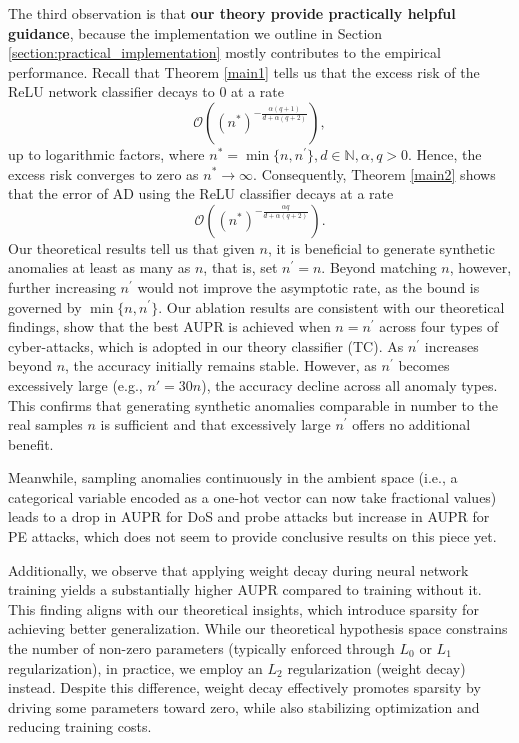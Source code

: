 \documentclass{article}
\def\NN{\mathbb N}
\begin{document}
The third observation is that \textbf{our theory provide practically helpful guidance}, because the implementation we outline in Section \ref{section:practical_implementation} mostly contributes to the empirical performance.
Recall that Theorem \ref{main1} tells us that the excess risk of the ReLU network classifier decays to $0$ at a rate $$\mathcal{O}\left((n^*)^{-{\frac{\alpha (q+1)}{d+ \alpha (q+2)}}}\right),$$ up to logarithmic factors, where $n^*= \min\{n,n^\prime\}, d\in \NN, \alpha,q>0$. Hence, the excess risk converges to zero as $n^* \to \infty$. Consequently, Theorem \ref{main2} shows that the error of AD using the ReLU classifier decays at a rate $$\mathcal{O}\left((n^*)^{-\frac{\alpha q}{d+ \alpha (q+2)}}\right).$$
Our theoretical results tell us that given $n$, it is beneficial to generate synthetic anomalies at least as many as $n$, that is, set $n^\prime = n$. Beyond matching $n$, however, further increasing 
$n^\prime$ would not improve the asymptotic rate, as the bound is governed by $\min\{n,n^\prime\}$.
Our ablation results are consistent with our theoretical findings, show that the best AUPR is achieved when $n=n^\prime$ across four types of cyber-attacks, which is adopted in our theory classifier (TC). As $n^\prime$ increases beyond $n$, the accuracy initially remains stable. However, as $n^\prime$  becomes excessively large (e.g., $ n' = 30n $), the accuracy decline across all anomaly types. This confirms that generating synthetic anomalies comparable in number to the real samples $n$ is sufficient and that excessively large $n^\prime$ offers no additional benefit. 



Meanwhile, sampling anomalies continuously in the ambient space (i.e., a categorical variable encoded as a one-hot vector can now take fractional values) leads to a drop in AUPR for DoS and probe attacks but increase in AUPR for PE attacks, which does not seem to provide conclusive results on this piece yet.

Additionally, we observe that applying weight decay during neural network training yields a substantially higher AUPR compared to training without it. This finding aligns with our theoretical insights, which introduce sparsity for achieving better generalization. While our theoretical hypothesis space constrains the number of non-zero parameters (typically enforced through $L_0$ or $L_1$ regularization), in practice, we employ an $L_2$ regularization (weight decay) instead. Despite this difference, weight decay effectively promotes sparsity by driving some parameters toward zero, while also stabilizing optimization and reducing training costs. 
\end{document}
